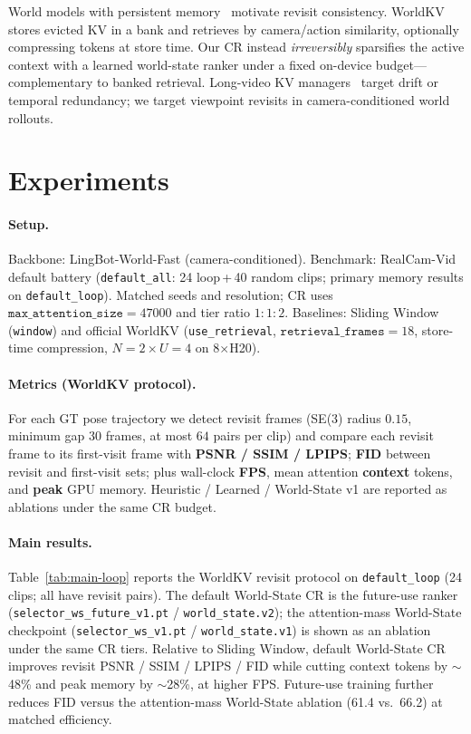 \documentclass{article}
\newcommand{\method}{World-State CR}
\begin{document}
World models with persistent
memory~\citep{robbyant2026lingbot,xiao2025worldmem,he2025matrix} motivate
revisit consistency.  WorldKV~\citep{yi2026worldkv} stores evicted KV in a
bank and retrieves by camera/action similarity, optionally compressing
tokens at store time.  Our CR instead \emph{irreversibly} sparsifies the
active context with a learned world-state ranker under a fixed on-device
budget---complementary to banked retrieval.  Long-video KV
managers~\citep{meng2026tether,luo2026future,samuel2026fastar} target drift
or temporal redundancy; we target viewpoint revisits in camera-conditioned
world rollouts.

\section{Experiments}
\label{sec:exp}

\paragraph{Setup.}
Backbone: LingBot-World-Fast (camera-conditioned).  Benchmark: RealCam-Vid
default battery (\texttt{default\_all}: 24 loop\,+\,40 random clips;
primary memory results on \texttt{default\_loop}).  Matched seeds and
resolution; CR uses $\texttt{max\_attention\_size}{=}47000$ and tier ratio
$1{:}1{:}2$.  Baselines: Sliding Window (\texttt{window}) and official
WorldKV (\texttt{use\_retrieval}, $\texttt{retrieval\_frames}{=}18$,
store-time compression, $N{=}2{\times}U{=}4$ on 8$\times$H20).

\paragraph{Metrics (WorldKV protocol).}
For each GT pose trajectory we detect revisit frames (SE(3) radius $0.15$,
minimum gap $30$ frames, at most $64$ pairs per clip) and compare each
revisit frame to its first-visit frame with \textbf{PSNR / SSIM / LPIPS};
\textbf{FID} between revisit and first-visit sets; plus wall-clock
\textbf{FPS}, mean attention \textbf{context} tokens, and \textbf{peak}
GPU memory.
Heuristic / Learned / World-State v1 are reported as ablations under the
same CR budget.

\paragraph{Main results.}
Table~\ref{tab:main-loop} reports the WorldKV revisit protocol on
\texttt{default\_loop} (24 clips; all have revisit pairs).
The default \method{} is the future-use ranker
(\texttt{selector\_ws\_future\_v1.pt} / \texttt{world\_state.v2});
the attention-mass World-State checkpoint
(\texttt{selector\_ws\_v1.pt} / \texttt{world\_state.v1}) is shown as an
ablation under the same CR tiers.
Relative to Sliding Window, default \method{} improves revisit PSNR /
SSIM / LPIPS / FID while cutting context tokens by $\sim$48\% and peak
memory by $\sim$28\%, at higher FPS.  Future-use training further reduces
FID versus the attention-mass World-State ablation (61.4 vs.\ 66.2) at
matched efficiency.
\end{document}
